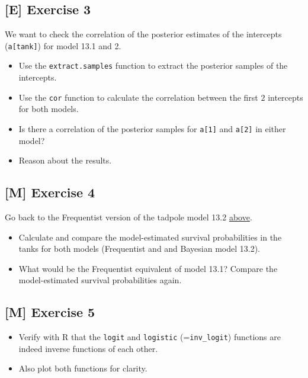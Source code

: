 \documentclass[
]{book}
\providecommand{\tightlist}{%
  \setlength{\itemsep}{0pt}\setlength{\parskip}{0pt}}
\begin{document}
\subsection{{[}E{]} Exercise 3}\label{exercise3_LMM}

We want to check the correlation of the posterior estimates of the intercepts (\texttt{a{[}tank{]}}) for model 13.1 and 2.

\begin{itemize}
\tightlist
\item
  Use the \texttt{extract.samples} function to extract the posterior samples of the intercepts.
\item
  Use the \texttt{cor} function to calculate the correlation between the first \(2\) intercepts for both models.
\item
  Is there a correlation of the posterior samples for \texttt{a{[}1{]}} and \texttt{a{[}2{]}} in either model?
\item
  Reason about the results.
\end{itemize}

\subsection{{[}M{]} Exercise 4}\label{exercise4_LMM}

Go back to the Frequentist version of the tadpole model 13.2 \hyperref[frequentist13_2]{above}.

\begin{itemize}
\tightlist
\item
  Calculate and compare the model-estimated survival probabilities in the tanks for
  both models (Frequentist and and Bayesian model 13.2).
\item
  What would be the Frequentist equivalent of model 13.1?
  Compare the model-estimated survival probabilities again.
\end{itemize}

\subsection{{[}M{]} Exercise 5}\label{exercise5_LMM}

\begin{itemize}
\tightlist
\item
  Verify with R that the \texttt{logit} and \texttt{logistic} (=\texttt{inv\_logit}) functions are indeed
  inverse functions of each other.
\item
  Also plot both functions for clarity.
\end{itemize}
\end{document}
